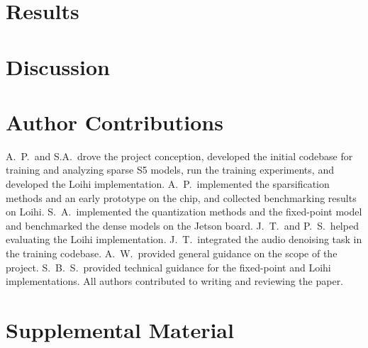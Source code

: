 \documentclass{article}
\begin{document}
\section{Results}
\label{sec:results}




\section{Discussion}
\label{sec:discussion}




\section*{Author Contributions}

A.\ P.\ and S.A.\ drove the project conception, developed the initial codebase for training and analyzing sparse S5 models, run the training experiments, and developed the Loihi implementation.
A.\ P.\ implemented the sparsification methods and an early prototype on the chip, and collected benchmarking results on Loihi.
S.\ A.\ implemented the quantization methods and the fixed-point model and benchmarked the dense models on the Jetson board.
J.\ T.\ and P.\ S.\ helped evaluating the Loihi implementation.
J.\ T.\ integrated the audio denoising task in the training codebase.
A.\ W.\ provided general guidance on the scope of the project.
S.\ B.\ S.\ provided technical guidance for the fixed-point and Loihi implementations.
All authors contributed to writing and reviewing the paper.






\clearpage
\appendix
\section{Supplemental Material}
\label{sec:appendix}

\end{document}
